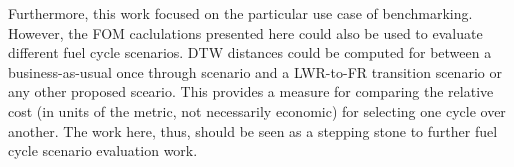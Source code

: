 Furthermore, this work focused on the particular use case of benchmarking.
However, the FOM caclulations presented here could also be used to evaluate 
different fuel cycle scenarios. DTW distances could be computed for between
a business-as-usual once through scenario and a LWR-to-FR transition
scenario or any other proposed sceario. This provides a measure for 
comparing the relative cost (in units of the metric, not necessarily 
economic) for selecting one cycle over another. The work here, thus, 
should be seen as a stepping stone to further fuel cycle scenario evaluation
work.
